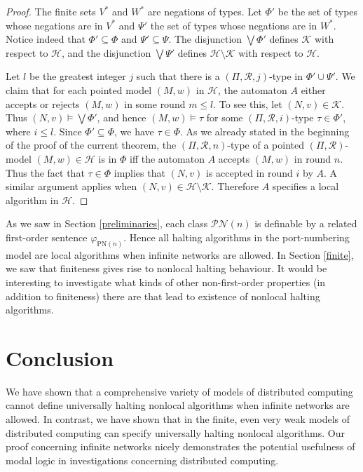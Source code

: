 \documentclass[copyright,creativecommons]{eptcs}
\begin{document}
\begin{proof}
The finite sets $V^*$ and $W^*$ are negations of types. Let $\Phi'$ be the set of types whose negations are in $V^*$
and $\Psi'$ the set of types whose negations are in $W^*$.
Notice indeed that $\Phi'\subseteq\Phi$ and $\Psi'\subseteq\Psi$.
The disjunction $\bigvee\Phi'$
defines $\mathcal{K}$
with respect to $\mathcal{H}$, and the disjunction $\bigvee\Psi'$ defines $\mathcal{H}\setminus\mathcal{K}$
with respect to $\mathcal{H}$.




Let $l$ be the greatest integer $j$ such that there is a $(\Pi,\mathcal{R},j)$-type in $\Phi'\cup\Psi'$.
We claim that for each pointed model $(M,w)$ in $\mathcal{H}$, the automaton $A$ either accepts or rejects $(M,w)$
in some round $m\leq l$. To see this, let $(N,v)\in\mathcal{K}$. Thus $(N,v)\models\bigvee\Phi'$,
and hence $(M,w)\models\tau$ for some $(\Pi,\mathcal{R},i)$-type $\tau\in\Phi'$, where $i\leq l$. 
Since $\Phi'\subseteq\Phi$, we have $\tau\in\Phi$.
As we already stated in the beginning of the proof of the current theorem,
the $(\Pi,\mathcal{R},n)$-type of a pointed $(\Pi,\mathcal{R})$-model $(M,w)\in\mathcal{H}$ is in $\Phi$ iff
the automaton $A$ accepts $(M,w)$ in round $n$.
Thus the fact that $\tau\in\Phi$ implies that $(N,v)$ is
accepted in round $i$ by $A$. A similar argument applies when $(N,v)\in\mathcal{H}\setminus\mathcal{K}$.
Therefore $A$ specifies a local algorithm in $\mathcal{H}$.
\end{proof}




As we saw in Section \ref{preliminaries}\hspace{0.4mm}, each class $\mathcal{PN}(n)$ is definable by a related first-order
sentence $\varphi_{\mathrm{PN}(n)}$. Hence all halting algorithms in the port-numbering model 
are local algorithms when infinite networks are allowed.
In Section \ref{finite}\hspace{0.4mm}, we saw that finiteness gives rise to
nonlocal halting behaviour. It would be interesting to
investigate what kinds of other non-first-order properties (in addition to finiteness)
there are that lead to existence of nonlocal halting algorithms.




\section{Conclusion}




We have shown that a comprehensive variety of models of 
distributed computing cannot define universally halting nonlocal algorithms when
infinite networks are allowed.
In contrast, we have shown that in the finite, even very weak models of distributed
computing can specify universally halting nonlocal algorithms.
Our proof concerning infinite networks nicely demonstrates the potential
usefulness of modal logic in investigations
concerning distributed computing.
\end{document}
